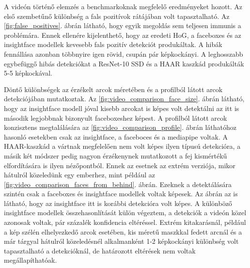 A videón történő elemzés a benchmarkoknak megfelelő eredményeket hozott. Az első szembetűnő különbség a fals pozitívok rátájában volt tapasztalható. Az \ref{fig:false_positives}. ábrán látható, hogy egyik megoldás sem teljesen immunis a problémára. Ennek ellenére kijelenthető, hogy az eredeti HoG, a faceboxes és az insightface modellek kevesebb fals pozitív detekciót produkáltak. A hibák fennállása azonban többnyire igen rövid, csupán pár képkockányi. A leghosszabb egybefüggő hibás detekciókat a ResNet-10 SSD és a HAAR kaszkád produkálták 5-5 képkockával.

Döntő különbségek az érzékelt arcok méretében és a profilból látott arcok detekciójában mutatkoztak. Az \ref{fig:video_comparison_face_size}. ábrán látható, hogy az insightface modell jóval kisebb arcokat is képes volt detektálni az itt is második legjobbnak bizonyult faceboxeshez képest. A profilból látott arcok konzisztens megtalálására az \ref{fig:video_comparison_profile}. ábrán láthatóhoz hasonló esetekben csak az insightface, a faceboces és a mediapipe voltak. A HAAR-kaszkád a vártnak megfelelően nem volt képes ilyen típusú detekcióra, a másik két módszer pedig nagyon érzékenynek mutatkozott a fej kismértékű elfordítására is ilyen nézőpontból. Ennek az esetnek az extrém verziója, mikor hátulról közeledünk egy emberhez, mint például az \ref{fig:video_comparison_faces_from_behind}. ábrán. Ezeknek a detektálására szintén csak a faceboxes és insightface modellek voltak képesek. Az ábrán az is látható, hogy az insightface itt is korábbi detekcióra volt képes. A különböző insightface modellek összehasonlítását külön végeztem, a detekciók a videón közel azonosak voltak, pár százalék konfidencia eltéréssel. Extrém kitakarásnál, például a kép szélén elhelyezkedő arcok esetében, kis méretű maszkkal fedett arcnál és a már tárgyal hátulról közeledésnél alkalmanként 1-2 képkockányi különbség volt tapasztalható a detekcióknál, de határozott eltérések nem voltak megállapíthatóak.

